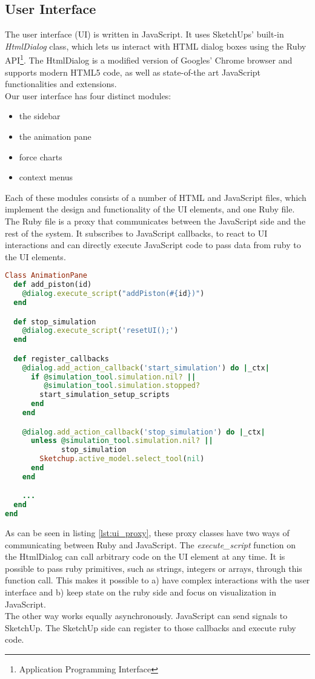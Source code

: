 \subsection{User Interface}
The user interface (UI) is written in JavaScript. It uses SketchUps' built-in \textit{HtmlDialog} class, which lets us interact with HTML dialog boxes using the Ruby API\footnote{Application Programming Interface}. The HtmlDialog is a modified version of Googles' Chrome browser and supports modern HTML5 code, as well as state-of-the art JavaScript functionalities and extensions.\\
Our user interface has four distinct modules:
\begin{itemize}
    \item the sidebar
    \item the animation pane
    \item force charts
    \item context menus
\end{itemize}

Each of these modules consists of a number of HTML and JavaScript files, which implement the design and functionality of the UI elements, and one Ruby file. The Ruby file is a proxy that communicates between the JavaScript side and the rest of the system. It subscribes to JavaScript callbacks, to react to UI interactions and can directly execute JavaScript code to pass data from ruby to the UI elements.
\begin{lstlisting}[language=Ruby, label={lst:ui_proxy}, caption=excerpt from UI callbacks]
Class AnimationPane
  def add_piston(id)
    @dialog.execute_script("addPiston(#{id})")
  end

  def stop_simulation
    @dialog.execute_script('resetUI();')
  end

  def register_callbacks
    @dialog.add_action_callback('start_simulation') do |_ctx|
      if @simulation_tool.simulation.nil? ||
         @simulation_tool.simulation.stopped?
        start_simulation_setup_scripts
      end
    end

    @dialog.add_action_callback('stop_simulation') do |_ctx|
      unless @simulation_tool.simulation.nil? ||
             stop_simulation
        Sketchup.active_model.select_tool(nil)
      end
    end

    ...
  end
end
\end{lstlisting}

As can be seen in listing \ref{lst:ui_proxy}, these proxy classes have two ways of communicating between Ruby and JavaScript. The \textit{execute\_script} function on the HtmlDialog can call arbitrary code on the UI element at any time. It is possible to pass ruby primitives, such as strings, integers or arrays, through this function call. This makes it possible to a) have complex interactions with the user interface and b) keep state on the ruby side and focus on visualization in JavaScript.\\
The other way works equally asynchronously. JavaScript can send signals to SketchUp. The SketchUp side can register to those callbacks and execute ruby code.


